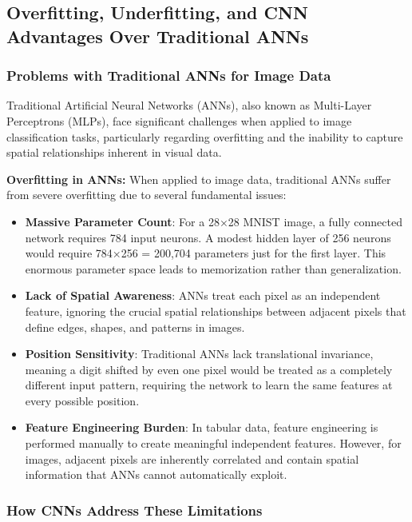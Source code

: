 \documentclass[a4paper, journal]{IEEEtran}
\begin{document}
\subsection{Overfitting, Underfitting, and CNN Advantages Over Traditional ANNs}

\subsubsection{Problems with Traditional ANNs for Image Data}

Traditional Artificial Neural Networks (ANNs), also known as Multi-Layer Perceptrons (MLPs), face significant challenges when applied to image classification tasks, particularly regarding overfitting and the inability to capture spatial relationships inherent in visual data.

\textbf{Overfitting in ANNs:}
When applied to image data, traditional ANNs suffer from severe overfitting due to several fundamental issues:

\begin{itemize}
    \item \textbf{Massive Parameter Count}: For a 28×28 MNIST image, a fully connected network requires 784 input neurons. A modest hidden layer of 256 neurons would require 784×256 = 200,704 parameters just for the first layer. This enormous parameter space leads to memorization rather than generalization.

    \item \textbf{Lack of Spatial Awareness}: ANNs treat each pixel as an independent feature, ignoring the crucial spatial relationships between adjacent pixels that define edges, shapes, and patterns in images.

    \item \textbf{Position Sensitivity}: Traditional ANNs lack translational invariance, meaning a digit shifted by even one pixel would be treated as a completely different input pattern, requiring the network to learn the same features at every possible position.

    \item \textbf{Feature Engineering Burden}: In tabular data, feature engineering is performed manually to create meaningful independent features. However, for images, adjacent pixels are inherently correlated and contain spatial information that ANNs cannot automatically exploit.
\end{itemize}

\subsubsection{How CNNs Address These Limitations}
\end{document}
